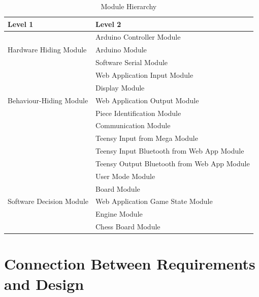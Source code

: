 \documentclass[12pt, titlepage]{article}
\begin{document}
\begin{table}[h!]
\centering
\begin{tabular}{p{} p{}}
\toprule
\textbf{Level 1} & \textbf{Level 2}\\
\midrule

\multirow{3}{0.3\textwidth}{Hardware Hiding Module}
& Arduino Controller Module \\ 
& Arduino Module \\
& Software Serial Module \\
\midrule

\multirow{5}{0.3\textwidth}{Behaviour-Hiding Module} 
& Web Application Input Module\\
& Display Module\\
& Web Application Output Module\\
& Piece Identification Module \\
& Communication Module\\
& Teensy Input from Mega Module\\
& Teensy Input Bluetooth from Web App Module\\
& Teensy Output Bluetooth from Web App Module\\
\midrule

\multirow{5}{0.3\textwidth}{Software Decision Module} 
& User Mode Module\\
& Board Module\\
& Web Application Game State Module\\
& Engine Module\\
& Chess Board Module\\
\bottomrule

\end{tabular}
\caption{Module Hierarchy}
\label{TblMH}
\end{table}

\section{Connection Between Requirements and Design} \label{SecConnection}
\end{document}
